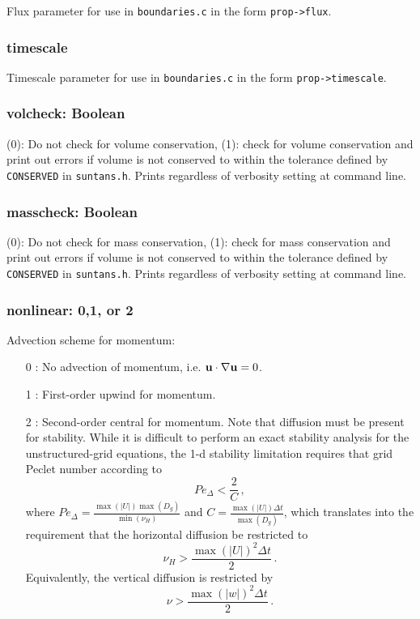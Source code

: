 Flux parameter for use in \verb+boundaries.c+ in the form \verb+prop->flux+.

\subsubsection{timescale}

Timescale parameter for use in \verb+boundaries.c+ in the form \verb+prop->timescale+.

\subsubsection{volcheck: Boolean}

(0): Do not check for volume conservation, (1): check for volume conservation and print out errors
if volume is not conserved to within the tolerance defined by \verb+CONSERVED+ in \verb+suntans.h+.
Prints regardless of verbosity setting at command line.

\subsubsection{masscheck: Boolean}

(0): Do not check for mass conservation, (1): check for mass conservation and print out errors
if volume is not conserved to within the tolerance defined by \verb+CONSERVED+ in \verb+suntans.h+.
Prints regardless of verbosity setting at command line.

\subsubsection{nonlinear: 0,1, or 2} \label{sec:nonlinear}

Advection scheme for momentum:
\begin{enumerate}
\item[0]: No advection of momentum, i.e. $\mathbf{u}\cdot\nabla\mathbf{u}=0$.
\item[1]: First-order upwind for momentum.
\item[2]: Second-order central for momentum.  Note that diffusion must be present for stability.  While
it is difficult to perform an exact stability analysis for the unstructured-grid equations, the 1-d
stability limitation requires that 
grid Peclet number according to 
\[
Pe_\Delta<\frac{2}{C}\,,
\]
where $Pe_\Delta = \frac{\max(|U|)\max(D_g)}{\min(\nu_H)}$ and $C=\frac{\max(|U|)\Delta t}{\max(D_g)}$,
which translates into the requirement that the horizontal diffusion be restricted to
\[
\nu_H>\frac{\max(|U|)^2\Delta t}{2}\,.
\]
Equivalently, the vertical diffusion is restricted by
\[
\nu>\frac{\max(|w|)^2\Delta t}{2}\,.
\]

\end{enumerate}

